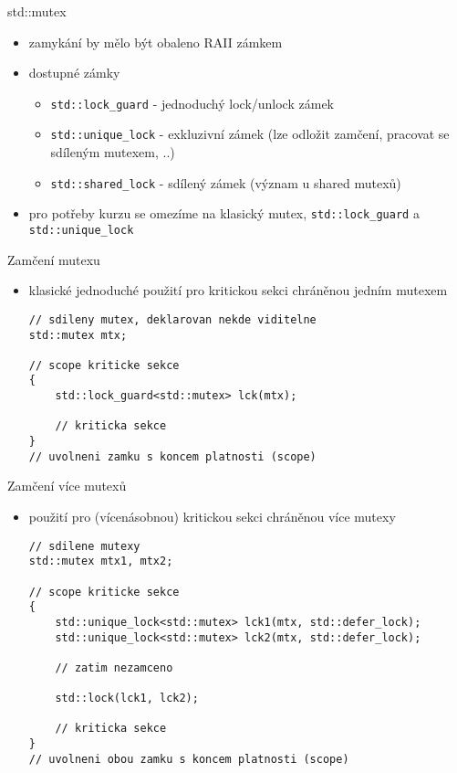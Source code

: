 \documentclass{beamer}
\begin{document}
\begin{xframe}{std::mutex}
	\begin{itemize}
		\item zamykání by mělo být obaleno RAII zámkem
		\item dostupné zámky
			\begin{itemize}
				\item \texttt{std::lock\_guard} - jednoduchý lock/unlock zámek
				\item \texttt{std::unique\_lock} - exkluzivní zámek (lze odložit zamčení, pracovat se sdíleným mutexem, ..)
				\item \texttt{std::shared\_lock} - sdílený zámek (význam u shared mutexů)
			\end{itemize}
		\item pro potřeby kurzu se omezíme na klasický mutex, \texttt{std::lock\_guard} a \texttt{std::unique\_lock}
	\end{itemize}
\end{xframe}

\begin{xframe}{Zamčení mutexu}
	\begin{itemize}
		\item klasické jednoduché použití pro kritickou sekci chráněnou jedním mutexem
\begin{lstlisting}[basicstyle=\fontsize{8}{9}\selectfont\ttfamily]
// sdileny mutex, deklarovan nekde viditelne
std::mutex mtx;

// scope kriticke sekce
{
    std::lock_guard<std::mutex> lck(mtx);
    
    // kriticka sekce
}
// uvolneni zamku s koncem platnosti (scope)
\end{lstlisting}
	\end{itemize}
\end{xframe}

\begin{xframe}{Zamčení více mutexů}
	\begin{itemize}
		\item použití pro (vícenásobnou) kritickou sekci chráněnou více mutexy
\begin{lstlisting}[basicstyle=\fontsize{8}{9}\selectfont\ttfamily]
// sdilene mutexy
std::mutex mtx1, mtx2;

// scope kriticke sekce
{
    std::unique_lock<std::mutex> lck1(mtx, std::defer_lock);
    std::unique_lock<std::mutex> lck2(mtx, std::defer_lock);
    
    // zatim nezamceno
    
    std::lock(lck1, lck2);
    
    // kriticka sekce
}
// uvolneni obou zamku s koncem platnosti (scope)
\end{lstlisting}
	\end{itemize}
\end{xframe}
\end{document}
